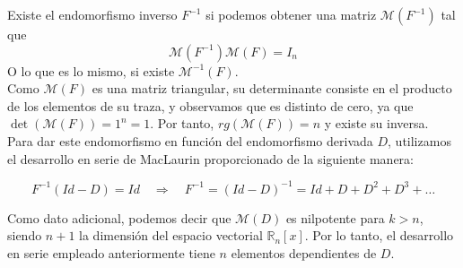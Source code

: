 \begin{itemize}[$\bullet$]
    Existe el endomorfismo inverso $F^{-1}$ si podemos obtener una matriz $\mathcal{M}(F^{-1})$
    tal que
    \begin{equation*}
        \mathcal{M}(F^{-1})\mathcal{M}(F) = I_{n}
    \end{equation*}
    O lo que es lo mismo, si existe $\mathcal{M}^{-1}(F)$.\\

    Como $\mathcal{M}(F)$ es una matriz triangular, su determinante consiste en el producto de los elementos de su traza, y observamos que es distinto de cero,
    ya que  $\det(\mathcal{M}(F)) = 1^n = 1$.
    Por tanto, $rg(\mathcal{M}(F)) = n$ y existe su inversa.\\

    Para dar este endomorfismo en función del endomorfismo derivada $D$, utilizamos el desarrollo en serie de MacLaurin proporcionado de la siguiente manera:

    \begin{equation*}
        F^{-1} (Id - D) = Id\hspace{12pt} \Rightarrow \hspace{12pt}  F^{-1} = (Id - D)^{-1} = Id + D + D^2 + D^3 + \ldots

    \end{equation*}

    Como dato adicional, podemos decir que $\mathcal{M}(D)$ es nilpotente para $k > n$, siendo $n + 1$ la dimensión del espacio vectorial $\mathbb{R}_n[x]$.
    Por lo tanto, el desarrollo en serie empleado anteriormente tiene $n$ elementos dependientes de $D$.


\end{itemize}